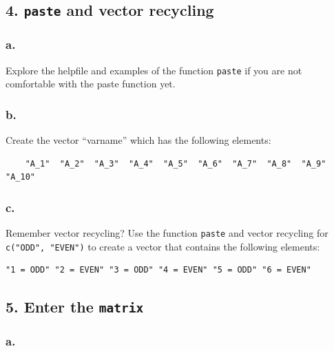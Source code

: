 \documentclass[]{article}
\begin{document}
\hypertarget{paste-and-vector-recycling}{%
\subsection{\texorpdfstring{4. \texttt{paste} and vector
recycling}{4. paste and vector recycling}}\label{paste-and-vector-recycling}}

\hypertarget{a.-1}{%
\subsubsection{a.}\label{a.-1}}

Explore the helpfile and examples of the function \texttt{paste} if you
are not comfortable with the paste function yet.

\hypertarget{b.-2}{%
\subsubsection{b.}\label{b.-2}}

Create the vector ``varname'' which has the following elements:

\begin{verbatim}
    "A_1"  "A_2"  "A_3"  "A_4"  "A_5"  "A_6"  "A_7"  "A_8"  "A_9"  "A_10"
\end{verbatim}

\hypertarget{c.-2}{%
\subsubsection{c.}\label{c.-2}}

Remember vector recycling? Use the function \texttt{paste} and vector
recycling for \texttt{c("ODD",\ "EVEN")} to create a vector that
contains the following elements:

\begin{verbatim}
"1 = ODD" "2 = EVEN" "3 = ODD" "4 = EVEN" "5 = ODD" "6 = EVEN" 
\end{verbatim}

\hypertarget{enter-the-matrix}{%
\subsection{\texorpdfstring{5. Enter the
\texttt{matrix}}{5. Enter the matrix}}\label{enter-the-matrix}}

\hypertarget{a.-2}{%
\subsubsection{a.}\label{a.-2}}
\end{document}
